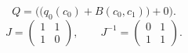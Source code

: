 \[Q=\bigl(\bigl(q_0(c_0)+B(c_0,c_1)\bigr)+0\bigr).\]
\[J=\begin{pmatrix}1&1\\1&0\end{pmatrix},\qquad J^{-1}=\begin{pmatrix}0&1\\1&1\end{pmatrix}.\]

